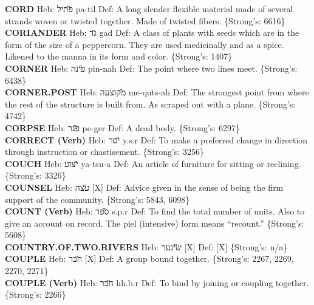 {\textbf{CORD} Heb: {\large\H פתיל} pa-til Def: A long slender flexible material made of several strands woven or twisted together. Made of twisted fibers. \{Strong's: 6616\}\hfill{}\\

\textbf{CORIANDER} Heb: {\large\H גד} gad Def: A class of plants with seeds which are in the form of the size of a peppercorn. They are used medicinally and as a spice. Likened to the manna in its form and color. \{Strong's: 1407\}\hfill{}\\

\textbf{CORNER} Heb: {\large\H פינה} pin-nah Def: The point where two lines meet. \{Strong's: 6438\}\hfill{}\\

\textbf{CORNER.POST} Heb: {\large\H מקוצעה} me-quts-ah Def: The strongest point from where the rest of the structure is built from. As scraped out with a plane. \{Strong's: 4742\}\hfill{}\\

\textbf{CORPSE} Heb: {\large\H פגר} pe-ger Def: A dead body. \{Strong's: 6297\}\hfill{}\\

\textbf{CORRECT (Verb)} Heb: {\large\H יסר} y.s.r Def: To make a preferred change in direction through instruction or chastisement. \{Strong's: 3256\}\hfill{}\\

\textbf{COUCH} Heb: {\large\H יצוע} ya-tsu-a Def: An article of furniture for sitting or reclining. \{Strong's: 3326\}\hfill{}\\

\textbf{COUNSEL} Heb: {\large\H עצה} {[}X{]} Def: Advice given in the sense of being the firm support of the community. \{Strong's: 5843, 6098\}\hfill{}\\

\textbf{COUNT (Verb)} Heb: {\large\H ספר} s.p.r Def: To find the total number of units. Also to give an account on record. The piel (intensive) form means ``recount.'' \{Strong's: 5608\}\hfill{}\\

\textbf{COUNTRY.OF.TWO.RIVERS} Heb: {\large\H שינער} {[}X{]} Def: {[}X{]} \{Strong's: n/a\}\hfill{}\\

\textbf{COUPLE} Heb: {\large\H חבר} {[}X{]} Def: A group bound together. \{Strong's: 2267, 2269, 2270, 2271\}\hfill{}\\

\textbf{COUPLE (Verb)} Heb: {\large\H חבר} hh.b.r Def: To bind by joining or coupling together. \{Strong's: 2266\}\hfill{}\\

}
